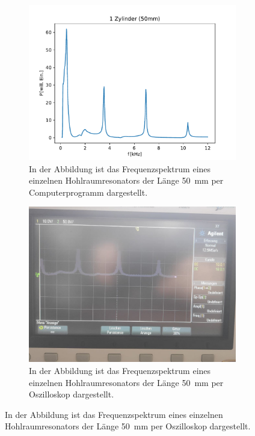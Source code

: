         \begin{figure}
            \centering
            \begin{subfigure}[b]{0.45\textwidth}
                \centering
                \includegraphics[scale=0.4]{./pictures/1_Zylinder_50mm.pdf}
                \caption{In der Abbildung ist das Frequenzspektrum eines einzelnen Hohlraumresonators der Länge \SI{50}{\milli\metre} per Computerprogramm dargestellt.}
            \end{subfigure}
            \hfill
            \centering
            \begin{subfigure}[b]{0.45\textwidth}
                \centering
                \includegraphics[scale=0.13]{./pictures/1_Zylinder.jpg}
                \caption{In der Abbildung ist das Frequenzspektrum eines einzelnen Hohlraumresonators der Länge \SI{50}{\milli\metre} per Oszilloskop dargestellt.}
            \end{subfigure}


\end{figure}
